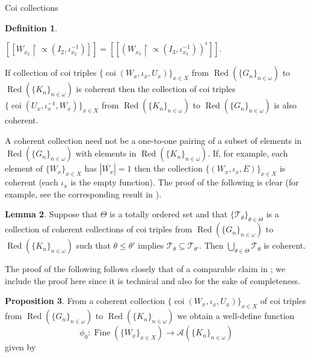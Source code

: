 \documentclass{amsart}
\theoremstyle{definition}\newtheorem{theorem}{Theorem}
\theoremstyle{definition}\newtheorem*{A}{Main Theorem}
\theoremstyle{definition}\newtheorem*{B}{Theorem \ref{elementaryequiv}}
\theoremstyle{definition}\newtheorem*{C}{Theorem \ref{continuous}}
\theoremstyle{definition}\newtheorem*{D}{Theorem \ref{bigisomorphism2}}
\theoremstyle{definition}\newtheorem{bigtheorem}{Main Theorem}
\numberwithin{theorem}{section}
\theoremstyle{definition}\newtheorem{corollary}[theorem]{Corollary}
\theoremstyle{definition}\newtheorem{proposition}[theorem]{Proposition}
\theoremstyle{definition}\newtheorem{definition}[theorem]{Definition}
\theoremstyle{definition}\newtheorem{question}[theorem]{Question}
\theoremstyle{definition}\newtheorem{example}[theorem]{Example}
\theoremstyle{definition}\newtheorem{remark}[theorem]{Remark}
\theoremstyle{definition}\newtheorem{note}[theorem]{Note}
\theoremstyle{definition}\newtheorem{lemma}[theorem]{Lemma}
\theoremstyle{definition}\newtheorem{fact}[theorem]{Fact}
\theoremstyle{definition}\newtheorem{define}[theorem]{Definition}
\theoremstyle{definition}\newtheorem{claim}[theorem]{Claim}
\theoremstyle{definition}\newtheorem{obs}[theorem]{Observation}
\theoremstyle{definition}\newtheorem{definitions}[theorem]{Definitions}
\newcommand{\Red}{\operatorname{Red}}
\newcommand{\Fine}{\operatorname{Fine}}
\newcommand{\coi}{\operatorname{coi}}
\begin{document}
\begin{section}{Coi collections}
\begin{definition}
\begin{center}

$[[W_{x_2} \upharpoonright \varpropto(I_2, \iota_{x_2}^{-1})]] = [[(W_{x_3} \upharpoonright \varpropto(I_3, \iota_{x_3}^{-1}))^{\epsilon}]]$.

\end{center}
\end{definition}

\noindent If collection of coi triples $\{\coi(W_x, \iota_x, U_x)\}_{x\in X}$ from $\Red(\{G_n\}_{n\in \omega})$ to $\Red(\{K_n\}_{n \in \omega})$ is coherent then the collection of coi triples $\{\coi(U_x, \iota_x^{-1}, W_x)\}_{x\in X}$ from $\Red(\{K_n\}_{n \in \omega})$ to $\Red(\{G_n\}_{n\in \omega})$ is also coherent.  

A coherent collection need not be a one-to-one pairing of a subset of elements in $\Red(\{G_n\}_{n\in \omega})$ with elements in $\Red(\{K_n\}_{n\in \omega})$.  If, for example, each element of $\{W_x\}_{x \in X}$ has $|\overline{W_x}| = 1$ then the collection $\{(W_x, \iota_x, E)\}_{x \in X}$ is coherent (each $\iota_x$ is the empty function).  The proof of the following is clear (for example, see the corresponding result in \cite{Cors}).

\begin{lemma}\label{ascendingchaincoi}  Suppose that $\Theta$ is a totally ordered set and that $\{\mathcal{T}_{\theta}\}_{\theta \in \Theta}$ is a collection of coherent collections of coi triples from $\Red(\{G_n\}_{n \in \omega})$ to $\Red(\{K_n\}_{n \in \omega})$ such that $\theta \leq \theta'$ implies $\mathcal{T}_{\theta} \subseteq \mathcal{T}_{\theta'}$.  Then $\bigcup_{\theta \in \Theta} \mathcal{T}_{\theta}$ is coherent.
\end{lemma}



The proof of the following follows closely that of a comparable claim in \cite{Cors}; we include the proof here since it is technical and also for the sake of completeness.

\begin{proposition}\label{welldefinedfuns}  From a coherent collection $\{\coi(W_x, \iota_x, U_x)\}_{x \in X}$ of coi triples from $\Red(\{G_n\}_{n \in \omega})$ to $\Red(\{K_n\}_{n \in \omega})$ we obtain a well-define function $$\phi_0 : \Fine(\{W_x\}_{x \in X}) \rightarrow \mathcal{A}(\{K_n\}_{n \in \omega})$$ given by

\begin{center}


\end{center}
\end{proposition}
\end{section}
\end{document}
